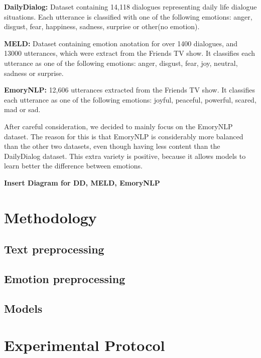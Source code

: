 \documentclass[oneside, a4paper, onecolumn, 11pt]{article}
\begin{document}
\textbf{DailyDialog: } \cite{li2017dailydialogmanuallylabelledmultiturn} Dataset containing 14,118 dialogues representing daily life dialogue situations. Each 
utterance is classified with one of the following emotions: anger, disgust, fear, happiness, sadness, surprise or other(no emotion).

\textbf{MELD: } \cite{poria2019meldmultimodalmultipartydataset} Dataset containing emotion anotation for over 1400 dialogues, and 13000 utterances, which were extract
from the Friends TV show. It classifies each utterance as one of the following emotions: anger, disgust, fear, joy, neutral, sadness or surprise.

\textbf{EmoryNLP: } \cite{zahiri2017emotiondetectiontvtranscripts} 12,606 utterances extracted from the Friends TV show. It classifies each utterance as one of the following
emotions: joyful, peaceful, powerful, scared, mad or sad.

After careful consideration, we decided to mainly focus on the EmoryNLP dataset. The reason for this is that EmoryNLP is considerably more balanced than the other two 
datasets, even though having less content than the DailyDialog dataset. This extra variety is positive, because it allows models to learn better the difference between
emotions.

\textbf{Insert Diagram for DD, MELD, EmoryNLP}

\section{Methodology}



\subsection{Text preprocessing}



\subsection{Emotion preprocessing}
\subsection{Models}




\section{Experimental Protocol}
\end{document}
